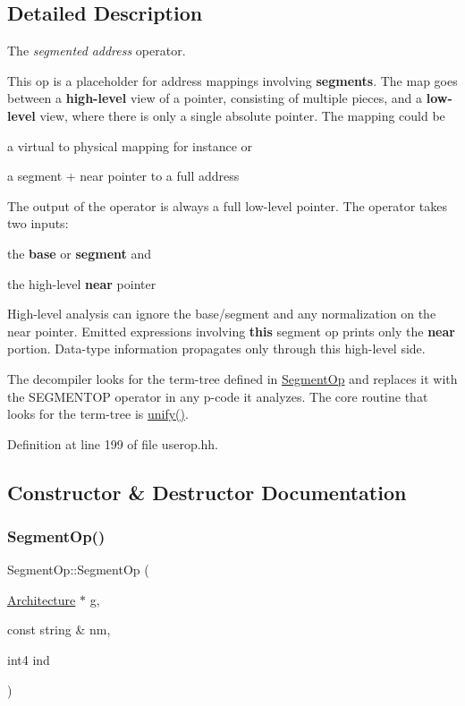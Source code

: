 \subsection{Detailed Description}
The {\itshape segmented} {\itshape address} operator. 

This op is a placeholder for address mappings involving {\bfseries{segments}}. The map goes between a {\bfseries{high-\/level}} view of a pointer, consisting of multiple pieces, and a {\bfseries{low-\/level}} view, where there is only a single absolute pointer. The mapping could be
\begin{DoxyItemize}
\item a virtual to physical mapping for instance or
\item a segment + near pointer to a full address
\end{DoxyItemize}

The output of the operator is always a full low-\/level pointer. The operator takes two inputs\+:
\begin{DoxyItemize}
\item the {\bfseries{base}} or {\bfseries{segment}} and
\item the high-\/level {\bfseries{near}} pointer
\end{DoxyItemize}

High-\/level analysis can ignore the base/segment and any normalization on the near pointer. Emitted expressions involving {\bfseries{this}} segment op prints only the {\bfseries{near}} portion. Data-\/type information propagates only through this high-\/level side.

The decompiler looks for the term-\/tree defined in \mbox{\hyperlink{class_segment_op}{Segment\+Op}} and replaces it with the S\+E\+G\+M\+E\+N\+T\+OP operator in any p-\/code it analyzes. The core routine that looks for the term-\/tree is \mbox{\hyperlink{class_segment_op_acb25104d3aad5e44a3c9d5b471e39c48}{unify()}}. 

Definition at line 199 of file userop.\+hh.



\subsection{Constructor \& Destructor Documentation}
\mbox{\label{class_segment_op_ad7459a581b241b35100f9fe260f0509f}} 
\subsubsection{\texorpdfstring{SegmentOp()}{SegmentOp()}}
{\footnotesize\ttfamily Segment\+Op\+::\+Segment\+Op (\begin{DoxyParamCaption}\item[{\mbox{\hyperlink{class_architecture}{Architecture}} $\ast$}]{g,  }\item[{const string \&}]{nm,  }\item[{int4}]{ind }\end{DoxyParamCaption})}



